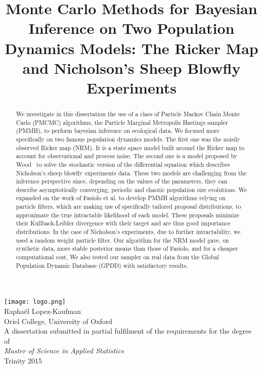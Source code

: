 \documentclass[12pt]{article}
\title{Monte Carlo Methods for Bayesian Inference on Two Population
	Dynamics Models: The Ricker Map and Nicholson's Sheep Blowfly Experiments}
\date{}
\begin{document}
	\maketitle 
	\thispagestyle{empty}
	\begin{center}
		\vspace{-5mm}
		\texttt{[image: logo.png]} \\
		\vspace{20mm}
		{\large Raphaël Lopez-Kaufman} \\
		\vspace{2mm}
		{\large Oriel College, University of Oxford} \\
		\vspace{40mm}
		A dissertation submitted in partial fulfilment of the requirements for the degree of \\
		\vspace{1mm}
		\textit{Master of Science in Applied Statistics} \\
		\vspace{1mm}
		Trinity 2015
	\end{center}
	
	\vspace{25 mm}
	
	\begin{abstract}
		We investigate in this dissertation the use of a class of Particle Markov Chain Monte Carlo (PMCMC) algorithms, the Particle Marginal Metropolis Hastings sampler (PMMH), to perform bayesian inference on ecological data. We focused more specifically on two famous population dynamics models. The first one was the noisily observed Ricker map (NRM). It is a state space model built around the Ricker map to account for observational and process noise. The second one is a model proposed by Wood~\cite{wood2010statistical} to solve the stochastic version of the differential equation which describes Nicholson's sheep blowfly experiments data. These two models are challenging from the inference perspective since, depending on the values of the parameters, they can describe asymptotically converging, periodic and chaotic population size evolutions. We expanded on the work of Fasiolo et al.\cite{fasiolo2014statistical} to develop PMMH algorithms relying on particle filters, which are making use of specifically tailored proposal distributions, to approximate the true intractable likelihood of each model. These proposals minimize their Kullback-Leibler divergence with their target and are thus good importance distributions. In the case of Nicholson's experiments, due to further intractability, we used a random weight particle filter. Our algorithm for the NRM model gave, on synthetic data, more stable  posterior means than those of Fasiolo, and for a cheaper computational cost. We also tested our sampler on real data from the Global Population Dynamic Database (GPDD) with satisfactory results.
	\end{abstract}
	
\end{document}
